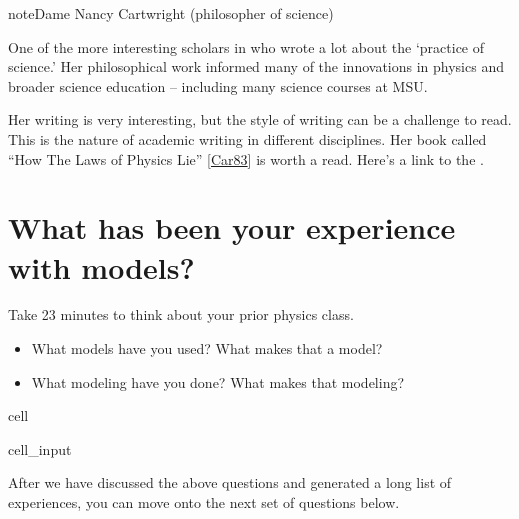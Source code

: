 \documentclass[letterpaper,10pt,english]{jupyterBook}
\begin{document}
\begin{sphinxadmonition}{note}{Dame Nancy Cartwright (philosopher of science)}

\sphinxAtStartPar
One of the more interesting scholars in  who wrote a lot about the ‘practice of science.’ Her philosophical work informed many of the innovations in physics and broader science education – including many science courses at MSU.

\sphinxAtStartPar
Her writing is very interesting, but the style of writing can be a challenge to read. This is the nature of academic writing in different disciplines. Her book called “How The Laws of Physics Lie” {[}\hyperlink{cite.jb_reference/markdown:id6}{Car83}{]} is worth a read. Here’s a link to the .
\end{sphinxadmonition}


\section{What has been your experience with models?}
\label{\detokenize{content/1_mechanics/modeling/activity-what_is_a_model:what-has-been-your-experience-with-models}}
\sphinxAtStartPar
Take 2\sphinxhyphen{}3 minutes to think about your prior physics class.
\begin{itemize}
\item {} 
\sphinxAtStartPar
What models have you used? What makes that a model?

\item {} 
\sphinxAtStartPar
What modeling have you done? What makes that modeling?

\end{itemize}

\begin{sphinxuseclass}{cell}\begin{sphinxVerbatimInput}

\begin{sphinxuseclass}{cell_input}
\begin{sphinxVerbatim}[commandchars=\\\{\}]

\end{sphinxVerbatim}

\end{sphinxuseclass}\end{sphinxVerbatimInput}

\end{sphinxuseclass}
\sphinxAtStartPar
After we have discussed the above questions and generated a long list of experiences, you can move onto the next set of questions below.
\end{document}
